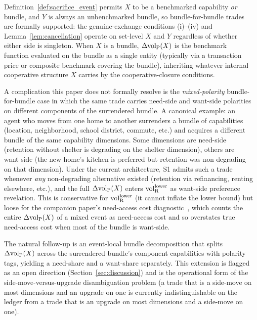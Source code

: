 \begin{remark}
\label{rem:bundle_for_bundle}
Definition~\ref{def:sacrifice_event} permits $X$ to be a
benchmarked capability \emph{or} bundle, and $Y$ is always an
unbenchmarked bundle, so bundle-for-bundle trades are
formally supported: the genuine-exchange conditions
(i)--(iv) and Lemma~\ref{lem:cancellation} operate on
set-level $X$ and $Y$ regardless of whether either side is
singleton.  When $X$ is a bundle, $\Delta{\operatorname{vol}_{\mathrm{P}}}(X)$ is the
benchmark function evaluated on the bundle as a single
entity (typically via a transaction price or composite
benchmark covering the bundle), inheriting whatever
internal cooperative structure $X$ carries by the
cooperative-closure conditions.

A complication this paper does not formally resolve is the
\emph{mixed-polarity} bundle-for-bundle case in which the
same trade carries need-side and want-side polarities on
different components of the surrendered bundle.  A canonical
example: an agent who moves from one home to another
surrenders a bundle of capabilities (location, neighborhood,
school district, commute, etc.) and acquires a different
bundle of the same capability dimensions.  Some dimensions are
need-side (retention without shelter is degrading on the
shelter dimension), others are want-side (the new home's
kitchen is preferred but retention was non-degrading on that
dimension).  Under the current architecture, S1 admits such a
trade whenever \emph{any} non-degrading alternative existed
(retention via refinancing, renting elsewhere, etc.), and the
full $\Delta{\operatorname{vol}_{\mathrm{P}}}(X)$ enters ${\operatorname{vol}_{\mathrm{R}}^{\mathrm{lower}}}$ as want-side
preference revelation.  This is conservative for ${\operatorname{vol}_{\mathrm{R}}^{\mathrm{lower}}}$
(it cannot inflate the lower bound) but loose for the
companion paper's need-access cost
diagnostic~\citep[Need~Sufficiency]{lasser2026paper8b}, which
counts the entire $\Delta{\operatorname{vol}_{\mathrm{P}}}(X)$ of a mixed event as
need-access cost and so overstates true need-access cost when
most of the bundle is want-side.

The natural follow-up is an event-local bundle decomposition
that splits $\Delta{\operatorname{vol}_{\mathrm{P}}}(X)$ across the surrendered bundle's
component capabilities with polarity tags, yielding a
need-share and a want-share separately.  This extension is
flagged as an open direction
(Section~\ref{sec:discussion}) and is the operational form
of the side-move-versus-upgrade disambiguation problem (a
trade that is a side-move on most dimensions and an upgrade
on one is currently indistinguishable on the ledger from a
trade that is an upgrade on most dimensions and a side-move
on one).
\end{remark}

